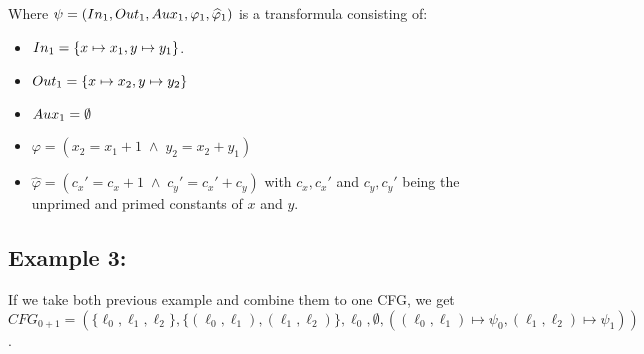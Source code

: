 \documentclass{article}
\begin{document}
	Where $\psi = (In_1, Out_1, Aux_1, \varphi_1, \widehat{\varphi}_1)$ is a transformula consisting of: 
	\begin{itemize}
		\item $In_1 = \{x \mapsto x_1, y \mapsto y_1 \}$.
		\item $Out_1 = \{ x \mapsto x_2, y \mapsto y_2 \}$
		\item $Aux_1 = \emptyset $
		\item $	\varphi = ( x_{2} = x_{1} + 1 \; \land \; y_{2} = x_{2} + y_{1} ) $
		\item $\widehat{\varphi} = ( c_{x}' = c_x + 1 \;\land\; c_{y}' = c_{x}' + c_y ) $ with $c_x, c_x'$ and $c_y, c_y'$ being the unprimed and primed constants of $x$ and $y$.
	\end{itemize}
    
	
	\subsection*{Example 3:}
	If we take both previous example and combine them to one CFG, we get \\ $CFG_{0+1} = (\{ \ell_0, \ell_1, \ell_2\}, \{ (\ell_0, \ell_1), (\ell_1, \ell_2)\}, \ell_0, \emptyset, ((\ell_0, \ell_1) \mapsto \psi_0, (\ell_1, \ell_2) \mapsto \psi_1))$.
	
	\bigskip
\end{document}
